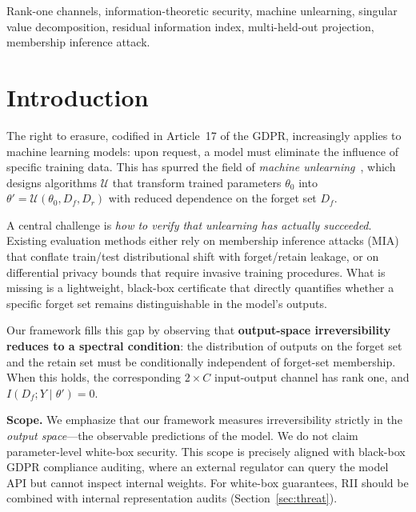 \documentclass[journal]{IEEEtran}
\theoremstyle{definition}
\begin{document}
\begin{IEEEkeywords}
Rank-one channels, information-theoretic security, machine unlearning, singular value decomposition, residual information index, multi-held-out projection, membership inference attack.
\end{IEEEkeywords}

\section{Introduction}
\label{sec:intro}

The right to erasure, codified in Article~17 of the GDPR, increasingly applies to machine learning models: upon request, a model must eliminate the influence of specific training data. This has spurred the field of \emph{machine unlearning}~\cite{bourtoule2021machine,nguyen2025survey}, which designs algorithms $\mathcal{U}$ that transform trained parameters $\theta_0$ into $\theta' = \mathcal{U}(\theta_0, D_f, D_r)$ with reduced dependence on the forget set $D_f$.

A central challenge is \emph{how to verify that unlearning has actually succeeded}. Existing evaluation methods either rely on membership inference attacks (MIA) that conflate train/test distributional shift with forget/retain leakage, or on differential privacy bounds that require invasive training procedures. What is missing is a lightweight, black-box certificate that directly quantifies whether a specific forget set remains distinguishable in the model's outputs.

Our framework fills this gap by observing that \textbf{output-space irreversibility reduces to a spectral condition}: the distribution of outputs on the forget set and the retain set must be conditionally independent of forget-set membership. When this holds, the corresponding $2\times C$ input-output channel has rank one, and $I(D_f; Y \mid \theta') = 0$.

\textbf{Scope.} We emphasize that our framework measures irreversibility strictly in the \emph{output space}---the observable predictions of the model. We do not claim parameter-level white-box security. This scope is precisely aligned with black-box GDPR compliance auditing, where an external regulator can query the model API but cannot inspect internal weights. For white-box guarantees, RII should be combined with internal representation audits (Section~\ref{sec:threat}).
\end{document}
